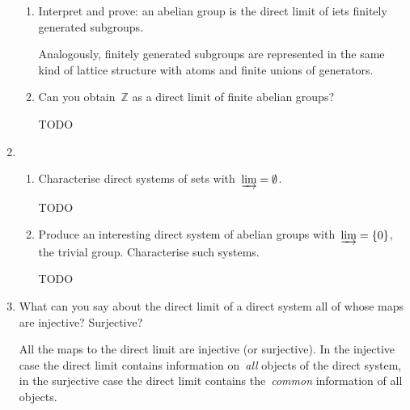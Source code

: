 \documentclass[a4paper,11pt]{article}
\begin{document}
\begin{enumerate}
\begin{enumerate}
      \item Interpret and prove: an abelian group is the direct limit of iets finitely generated subgroups.

        \begin{solution}
          Analogously, finitely generated subgroups are represented in the same kind of lattice structure with atoms and finite unions of generators. 
        \end{solution}

      \item Can you obtain~$\mathbb{Z}$ as a direct limit of finite abelian groups?

        \begin{solution}
          TODO
        \end{solution}
    \end{enumerate}

  \item
    \begin{enumerate}
      \item Characterise direct systems of sets with~$\varinjlim=\emptyset$.

        \begin{solution}
          TODO
        \end{solution}

      \item Produce an interesting direct system of abelian groups with~$\varinjlim=\left\{ 0 \right\}$, the trivial group. Characterise such systems.

        \begin{solution}
          TODO
        \end{solution}
    \end{enumerate}

  \item What can you say about the direct limit of a direct system all of whose maps are injective? Surjective?

    \begin{solution}
      All the maps to the direct limit are injective (or surjective). In the injective case the direct limit contains information on~\emph{all} objects of the direct system, in the surjective case the direct limit contains the~\emph{common} information of all objects.
    \end{solution}


\end{enumerate}
\end{document}
